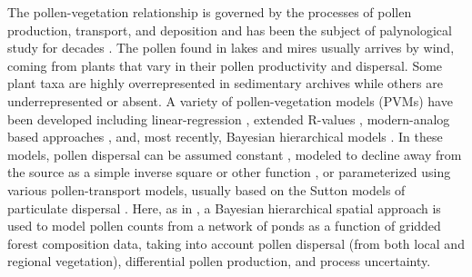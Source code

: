 \documentclass[12pt]{article}
\begin{document}


The pollen-vegetation relationship is governed by the processes of
pollen production, transport, and deposition and has been the subject
of palynological study for decades \citep{tauber1965,
  jacobson1981selection, jackson1994pollen, jackson1999pollen,
  sugita2007theory1, sugita2007theory2, prentice1988records}. The
pollen found in lakes and mires usually arrives by wind, coming from
plants that vary in their pollen productivity and dispersal. Some
plant taxa are highly overrepresented in sedimentary archives while
others are underrepresented or absent. A variety of pollen-vegetation
models (PVMs) have been developed including linear-regression
\citep{webb1981estimating, bradshaw1985relationships}, extended
R-values \citep{parsons1981statistical, sugita1994pollen,
  sugita2007theory1, sugita2007theory2}, modern-analog based
approaches \citep{overpeck1985quantitative, williams2003variations},
and, most recently, Bayesian hierarchical models
\citep{paciorek2009mapping, garreta2010method}.  In these models,
pollen dispersal can be assumed constant \citep{davis1963theory,
  parsons1981statistical}, modeled to decline away from the source as
a simple inverse square or other function \citep{webb1981estimating,
  calcote1995pollen, jackson1998quantitative}, or parameterized using
various pollen-transport models, usually based on the Sutton models of
particulate dispersal \citep{prentice1988records, sugita2007theory1,
  sugita2007theory2, jackson1999pollen}. Here, as in
\citet{paciorek2009mapping}, a Bayesian hierarchical spatial approach
is used to model pollen counts from a network of ponds as a function
of gridded forest composition data, taking into account pollen
dispersal (from both local and regional vegetation), differential
pollen production, and process uncertainty. 
\end{document}
